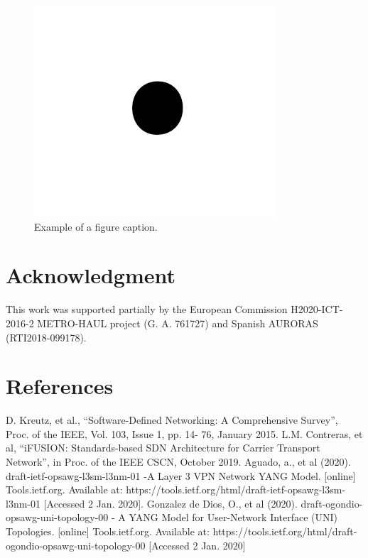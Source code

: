 \documentclass[conference]{IEEEtran}
\begin{document}
\begin{figure}[htbp]
\centerline{\includegraphics{fig1.png}}
\caption{Example of a figure caption.}
\label{fig}
\end{figure}

\section*{Acknowledgment}

This work was supported partially by the European Commission H2020-ICT-2016-2 METRO-HAUL project (G. A. 761727) and Spanish AURORAS (RTI2018-099178).

\section*{References}

\begin{thebibliography}{00}
 D. Kreutz, et al., “Software-Defined Networking: A Comprehensive Survey”, Proc. of the IEEE, Vol. 103, Issue 1, pp. 14- 76, January 2015.
 L.M. Contreras, et al, “iFUSION: Standards-based SDN Architecture for Carrier Transport Network”, in Proc. of the IEEE CSCN, October 2019.
 Aguado, a., et al (2020). draft-ietf-opsawg-l3sm-l3nm-01 -A Layer 3 VPN Network YANG Model. [online] Tools.ietf.org. Available at: https://tools.ietf.org/html/draft-ietf-opsawg-l3sm-l3nm-01 [Accessed 2 Jan. 2020].
 Gonzalez de Dios, O., et al (2020). draft-ogondio-opsawg-uni-topology-00 - A YANG Model for User-Network Interface (UNI) Topologies. [online] Tools.ietf.org. Available at: https://tools.ietf.org/html/draft-ogondio-opsawg-uni-topology-00 [Accessed 2 Jan. 2020]
\end{thebibliography}
\end{document}
